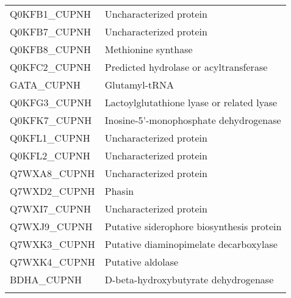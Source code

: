 \begin{center}
\begin{longtable}{ l l }
Q0KFB1\_CUPNH & Uncharacterized protein \\ [0.5ex]
Q0KFB7\_CUPNH & Uncharacterized protein \\ [0.5ex]
Q0KFB8\_CUPNH & Methionine synthase \\ [0.5ex]
Q0KFC2\_CUPNH & Predicted hydrolase or acyltransferase \\ [0.5ex]
GATA\_CUPNH & Glutamyl-tRNA \\ [0.5ex]
Q0KFG3\_CUPNH & Lactoylglutathione lyase or related lyase \\ [0.5ex]
Q0KFK7\_CUPNH & Inosine-5'-monophosphate dehydrogenase \\ [0.5ex]
Q0KFL1\_CUPNH & Uncharacterized protein \\ [0.5ex]
Q0KFL2\_CUPNH & Uncharacterized protein \\ [0.5ex]
Q7WXA8\_CUPNH & Uncharacterized protein \\ [0.5ex]
Q7WXD2\_CUPNH & Phasin \\ [0.5ex]
Q7WXI7\_CUPNH & Uncharacterized protein \\ [0.5ex]
Q7WXJ9\_CUPNH & Putative siderophore biosynthesis protein \\ [0.5ex]
Q7WXK3\_CUPNH & Putative diaminopimelate decarboxylase \\ [0.5ex]
Q7WXK4\_CUPNH & Putative aldolase \\ [0.5ex]
BDHA\_CUPNH & D-beta-hydroxybutyrate dehydrogenase \\ [0.5ex] \bottomrule
\label{table:ralstonia-proteins}
\end{longtable}
\end{center}
